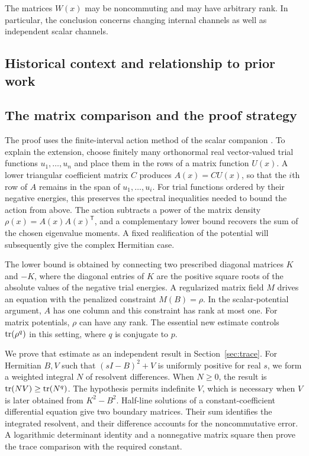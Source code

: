 The matrices $W(x)$ may be noncommuting and may have arbitrary rank. In
particular, the conclusion concerns changing internal channels as well as
independent scalar channels.

\subsection{Historical context and relationship to prior work}


\subsection{The matrix comparison and the proof strategy}
The proof uses the finite-interval action method of the scalar companion
\cite{ScalarCompanion}. To explain the extension, choose finitely many
orthonormal real vector-valued trial functions $u_1,\ldots,u_n$ and place them in
the rows of a matrix function $U(x)$. A lower triangular coefficient matrix
$C$ produces $A(x)=CU(x)$, so that the $i$th row of $A$ remains in the span
of $u_1,\ldots,u_i$. For trial functions ordered by their negative energies,
this preserves the spectral inequalities needed to bound the action from above.
The action subtracts a power of the matrix density
$\rho(x)=A(x)A(x)^{\mathsf T}$, and a complementary lower bound recovers
the sum of the chosen eigenvalue moments. A fixed realification of the
potential will subsequently give the complex Hermitian case.

The lower bound is obtained by connecting two prescribed diagonal matrices
$K$ and $-K$, where the diagonal entries of $K$ are the positive square roots
of the absolute values of the negative trial energies. A regularized matrix field $M$ drives an equation with the
penalized constraint $M(B)=\rho$. In the scalar-potential argument,
$A$ has one column and this constraint has rank at most one. For matrix
potentials, $\rho$ can have any rank. The essential new estimate controls
$\operatorname{tr}(\rho^q)$ in this setting, where $q$ is conjugate to $p$.

We prove that estimate as an independent result in Section~\ref{sec:trace}.
For Hermitian $B,V$ such that $(sI-B)^2+V$ is uniformly positive for real $s$,
we form a weighted integral $N$ of resolvent differences. When $N\ge0$,
the result is $\operatorname{tr}(NV)\ge\operatorname{tr}(N^q)$. The hypothesis permits indefinite $V$,
which is necessary when $V$ is later obtained from $K^2-B^2$.
Half-line solutions of a constant-coefficient differential equation give
two boundary matrices. Their sum identifies the integrated resolvent,
and their difference accounts for the noncommutative error. A logarithmic
determinant identity and a nonnegative matrix square then prove the trace
comparison with the required constant.

